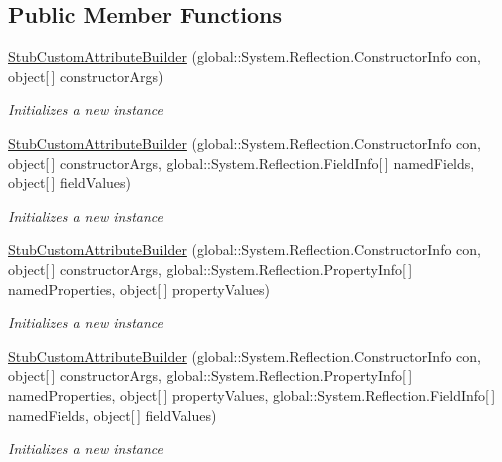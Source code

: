 \subsection*{Public Member Functions}
\begin{DoxyCompactItemize}
\item 
\hyperlink{class_system_1_1_reflection_1_1_emit_1_1_fakes_1_1_stub_custom_attribute_builder_ad3c6caf9fda6dc573b9bd0fbc6d1e152}{Stub\-Custom\-Attribute\-Builder} (global\-::\-System.\-Reflection.\-Constructor\-Info con, object\mbox{[}$\,$\mbox{]} constructor\-Args)
\begin{DoxyCompactList}\small\item\em Initializes a new instance\end{DoxyCompactList}\item 
\hyperlink{class_system_1_1_reflection_1_1_emit_1_1_fakes_1_1_stub_custom_attribute_builder_ab4ce648a69fc10bc643dc8cc75d9376f}{Stub\-Custom\-Attribute\-Builder} (global\-::\-System.\-Reflection.\-Constructor\-Info con, object\mbox{[}$\,$\mbox{]} constructor\-Args, global\-::\-System.\-Reflection.\-Field\-Info\mbox{[}$\,$\mbox{]} named\-Fields, object\mbox{[}$\,$\mbox{]} field\-Values)
\begin{DoxyCompactList}\small\item\em Initializes a new instance\end{DoxyCompactList}\item 
\hyperlink{class_system_1_1_reflection_1_1_emit_1_1_fakes_1_1_stub_custom_attribute_builder_ae98a967ba1e1c2278390e6ec27081300}{Stub\-Custom\-Attribute\-Builder} (global\-::\-System.\-Reflection.\-Constructor\-Info con, object\mbox{[}$\,$\mbox{]} constructor\-Args, global\-::\-System.\-Reflection.\-Property\-Info\mbox{[}$\,$\mbox{]} named\-Properties, object\mbox{[}$\,$\mbox{]} property\-Values)
\begin{DoxyCompactList}\small\item\em Initializes a new instance\end{DoxyCompactList}\item 
\hyperlink{class_system_1_1_reflection_1_1_emit_1_1_fakes_1_1_stub_custom_attribute_builder_a2d029571d5a033bf7f5c0d23b0a7526a}{Stub\-Custom\-Attribute\-Builder} (global\-::\-System.\-Reflection.\-Constructor\-Info con, object\mbox{[}$\,$\mbox{]} constructor\-Args, global\-::\-System.\-Reflection.\-Property\-Info\mbox{[}$\,$\mbox{]} named\-Properties, object\mbox{[}$\,$\mbox{]} property\-Values, global\-::\-System.\-Reflection.\-Field\-Info\mbox{[}$\,$\mbox{]} named\-Fields, object\mbox{[}$\,$\mbox{]} field\-Values)
\begin{DoxyCompactList}\small\item\em Initializes a new instance\end{DoxyCompactList}\end{DoxyCompactItemize}
